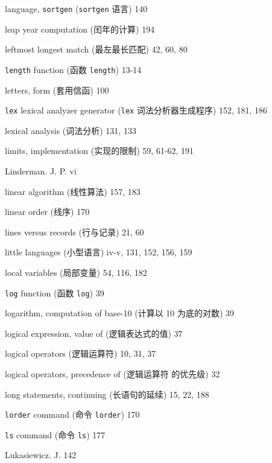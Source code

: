 \begin{multicols}{2}
\hangindent=2pc  language, \verb'sortgen' (\verb'sortgen' 语言) 140

\hangindent=2pc  leap year computation (闰年的计算) 194

\hangindent=2pc  leftmost longest match (最左最长匹配) 42, 60, 80

\hangindent=2pc  \verb'length' function (函数 \verb'length') 13-14

\hangindent=2pc  letters, form (套用信函) 100

\hangindent=2pc  \verb'lex' lexical analyzer generator
(\verb'lex' 词法分析器生成程序) 152, 181, 186

\hangindent=2pc  lexical analysis (词法分析) 131, 133

\hangindent=2pc  limits, implementation (实现的限制) 59, 61-62, 191

\hangindent=2pc  Linderman. J. P. vi

\hangindent=2pc  linear algorithm (线性算法) 157, 183

\hangindent=2pc  linear order (线序) 170

\hangindent=2pc  lines versus records (行与记录) 21, 60

\hangindent=2pc  little languages (小型语言) iv-v, 131, 152, 156, 159

\hangindent=2pc  local variables (局部变量) 54, 116, 182

\hangindent=2pc  \verb'log' function (函数 \verb'log') 39

\hangindent=2pc  logarithm, computation of base-10 (计算以 10
为底的对数) 39

\hangindent=2pc  logical expression, value of (逻辑表达式的值) 37

\hangindent=2pc  logical operators (逻辑运算符) 10, 31, 37

\hangindent=2pc  logical operators, precedence of (逻辑运算符
的优先级) 32

\hangindent=2pc  long statements, continuing (长语句的延续)
15, 22, 188

\hangindent=2pc  \verb'lorder' command (命令 \verb'lorder') 170

\hangindent=2pc  \verb'ls' command (命令 \verb'ls') 177

\hangindent=2pc  Lukasiewicz. J. 142


\end{multicols}
